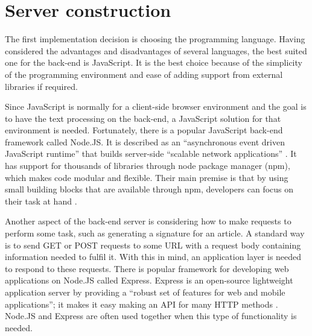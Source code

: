 \documentclass[11pt,titlepage]{report}
\begin{document}
\section{Server construction}
The first implementation decision is choosing the programming language. Having considered the advantages and disadvantages of several languages, the best suited one for the back-end is JavaScript. It is the best choice because of the simplicity of the programming environment and ease of adding support from external libraries if required. 

Since JavaScript is normally for a client-side browser environment and the goal is to have the text processing on the back-end, a JavaScript solution for that environment is needed. Fortunately, there is a popular JavaScript back-end framework called Node.JS. It is described as an ``asynchronous event driven JavaScript runtime'' that builds server-side ``scalable network applications'' \cite{node_js}. It has support for thousands of libraries through node package manager (npm), which makes code modular and flexible. Their main premise is that by using small building blocks that are available through npm, developers can focus on their task at hand \cite{npm_about}.

Another aspect of the back-end server is considering how to make requests to perform some task, such as generating a signature for an article. A standard way is to send GET or POST requests to some URL with a request body containing information needed to fulfil it. With this in mind, an application layer is needed to respond to these requests. There is popular framework for developing web applications on Node.JS called Express. Express is an open-source lightweight application server by providing a ``robust set of features for web and mobile applications''; it makes it easy making an API for many HTTP methods \cite{express_js}. Node.JS and Express are often used together when this type of functionality is needed.
\end{document}
